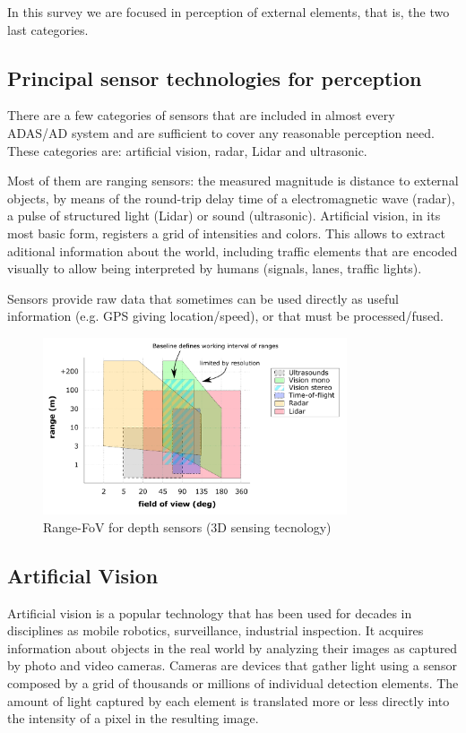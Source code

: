 In this survey we are focused in perception of external elements, that is, the
two last categories.

\subsection{Principal sensor technologies for perception}

There are a few categories of sensors that are included in almost every ADAS/AD
system and are sufficient to cover any reasonable perception need. 
These categories are: artificial vision, radar, Lidar and 
ultrasonic.

Most of them are ranging sensors: the measured magnitude is distance to 
external objects, by means of the round-trip delay time of a electromagnetic 
wave (radar), a pulse of structured light (Lidar) or sound (ultrasonic).
Artificial vision, in its most basic form, registers a grid of intensities and 
colors. This allows to extract aditional information about the world, including 
traffic elements that are encoded visually to allow being interpreted by humans 
(signals, lanes, traffic lights).

Sensors provide raw data that sometimes can be used directly as useful
information (e.g. GPS giving location/speed), or that must be processed/fused.

\begin{figure}[h]
    \centering
    \includegraphics[width=0.8\textwidth]{"img/plot_range-fov"}
    \caption{Range-FoV for depth sensors (3D sensing tecnology)}
    \label{fig:range-fov}
\end{figure}

\subsection{Artificial Vision}
Artificial vision is a popular technology that has been used for decades in 
disciplines as mobile robotics, surveillance, industrial inspection. It acquires
information about objects in the real world by analyzing their images as 
captured by photo and video cameras. Cameras are devices that gather light using
a sensor composed by a grid of thousands or millions of individual detection 
elements. The amount of light captured by each element is translated more or 
less directly into the intensity of a pixel in the resulting image. 

